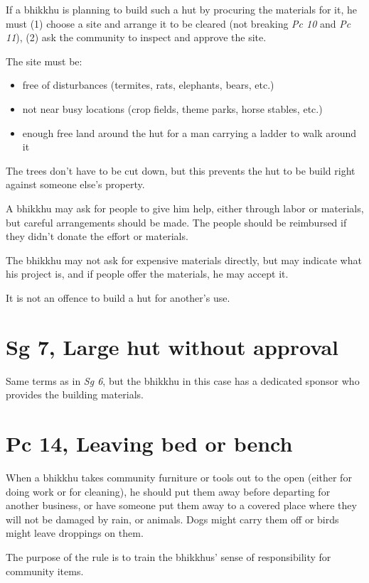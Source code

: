 If a bhikkhu is planning to build such a hut by procuring the materials
for it, he must (1) choose a site and arrange it to be cleared (not
breaking \emph{Pc 10} and \emph{Pc 11}), (2) ask the community to
inspect and approve the site.

The site must be:

\begin{itemize}
\tightlist
\item
  free of disturbances (termites, rats, elephants, bears, etc.)
\item
  not near busy locations (crop fields, theme parks, horse stables,
  etc.)
\item
  enough free land around the hut for a man carrying a ladder to walk
  around it
\end{itemize}

The trees don't have to be cut down, but this prevents the hut to be
build right against someone else's property.

A bhikkhu may ask for people to give him help, either through labor or
materials, but careful arrangements should be made. The people should be
reimbursed if they didn't donate the effort or materials.

The bhikkhu may not ask for expensive materials directly, but may
indicate what his project is, and if people offer the materials, he may
accept it.

It is not an offence to build a hut for another's use.

\section{Sg 7, Large hut without approval}

Same terms as in \emph{Sg 6}, but the bhikkhu in this case has a
dedicated sponsor who provides the building materials.

\section{Pc 14, Leaving bed or bench}

When a bhikkhu takes community furniture or tools out to the open
(either for doing work or for cleaning), he should put them away before
departing for another business, or have someone put them away to a
covered place where they will not be damaged by rain, or animals. Dogs
might carry them off or birds might leave droppings on them.

The purpose of the rule is to train the bhikkhus' sense of
responsibility for community items.

